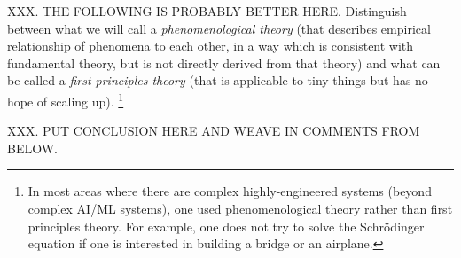 XXX.  THE FOLLOWING IS PROBABLY BETTER HERE.
Distinguish between what we will call a
\emph{phenomenological theory}
(that describes empirical relationship of phenomena to each other, in a way which is consistent with fundamental theory, but is not directly derived from that theory)
and what can be called a 
\emph{first principles theory} 
(that is applicable to tiny things but has no hope of scaling up).
\footnote{In most areas where there are complex highly-engineered systems (beyond complex AI/ML systems), one used phenomenological theory rather than first principles theory.  For example, one does not try to solve the Schr\"odinger equation if one is interested in building a bridge or an airplane.}




XXX.  PUT CONCLUSION HERE AND WEAVE IN COMMENTS FROM BELOW.


